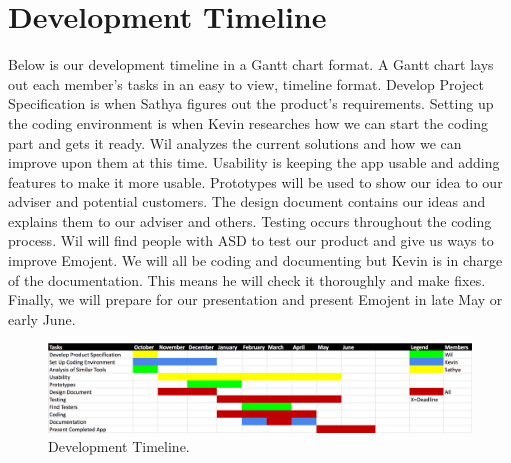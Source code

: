 \chapter{Development Timeline}
Below is our development timeline in a Gantt chart format. A Gantt chart lays out each member's tasks in an easy to view, timeline format. Develop Project Specification is when Sathya figures out the product's requirements. Setting up the coding environment is when Kevin researches how we can start the coding part and gets it ready. Wil analyzes the current solutions and how we can improve upon them at this time. Usability is keeping the app usable and adding features to make it more usable. Prototypes will be used to show our idea to our adviser and potential customers. The design document contains our ideas and explains them to our adviser and others. Testing occurs throughout the coding process. Wil will find people with ASD to test our product and give us ways to improve Emojent. We will all be coding and documenting but Kevin is in charge of the documentation. This means he will check it thoroughly and make fixes. Finally, we will prepare for our presentation and present Emojent in late May or early June. 
\begin{figure}
    \centering
    \includegraphics[scale=.5]{ganttChart.png}  
    \caption{\label{fig:Development Timeline}Development Timeline.} 
\end{figure}